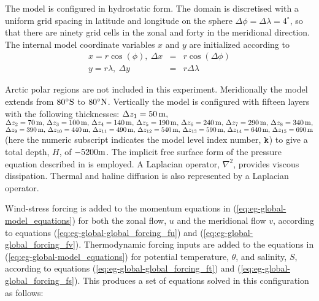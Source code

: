 The model is configured in hydrostatic form.  The domain is
discretised with a uniform grid spacing in latitude and longitude on
the sphere $\Delta \phi=\Delta \lambda=4^{\circ}$, so that there are
ninety grid cells in the zonal and forty in the meridional
direction. The internal model coordinate variables $x$ and $y$ are
initialized according to
\begin{eqnarray}
x=r\cos(\phi),~\Delta x & = &r\cos(\Delta \phi) \\
y=r\lambda,~\Delta y &= &r\Delta \lambda
\end{eqnarray}

Arctic polar regions are not
included in this experiment. Meridionally the model extends from
$80^{\circ}{\rm S}$ to $80^{\circ}{\rm N}$.
Vertically the model is configured with fifteen layers with the
following thicknesses:
$\Delta z_{1} = 50\,{\rm m},$\\
$\Delta z_{2} = 70\,{\rm m},\,
 \Delta z_{3} = 100\,{\rm m},\,
 \Delta z_{4} = 140\,{\rm m},\,
 \Delta z_{5} = 190\,{\rm m},\,
 \Delta z_{6} = 240\,{\rm m},\,
 \Delta z_{7} = 290\,{\rm m},\,
 \Delta z_{8} = 340\,{\rm m},$\\
$\Delta z_{9} = 390\,{\rm m},\,
 \Delta z_{10}= 440\,{\rm m},\,
 \Delta z_{11}= 490\,{\rm m},\,
 \Delta z_{12}= 540\,{\rm m},\,
 \Delta z_{13}= 590\,{\rm m},\,
 \Delta z_{14}= 640\,{\rm m},\,
 \Delta z_{15}= 690\,{\rm m}$\\
(here the numeric subscript indicates the model level index number, ${\tt k}$) to
give a total depth, $H$, of $-5200{\rm m}$.
The implicit free surface form of the pressure equation described in
\citet{marshall:97a} is employed. A Laplacian operator, $\nabla^2$, provides viscous
dissipation. Thermal and haline diffusion is also represented by a Laplacian operator.

Wind-stress forcing is added to the momentum equations in (\ref{eq:eg-global-model_equations})
for both the zonal flow, $u$ and the meridional flow $v$, according to equations
(\ref{eq:eg-global-global_forcing_fu}) and (\ref{eq:eg-global-global_forcing_fv}).
Thermodynamic forcing inputs are added to the equations
in (\ref{eq:eg-global-model_equations}) for
potential temperature, $\theta$, and salinity, $S$, according to equations
(\ref{eq:eg-global-global_forcing_ft}) and (\ref{eq:eg-global-global_forcing_fs}).
This produces a set of equations solved in this configuration as follows:

